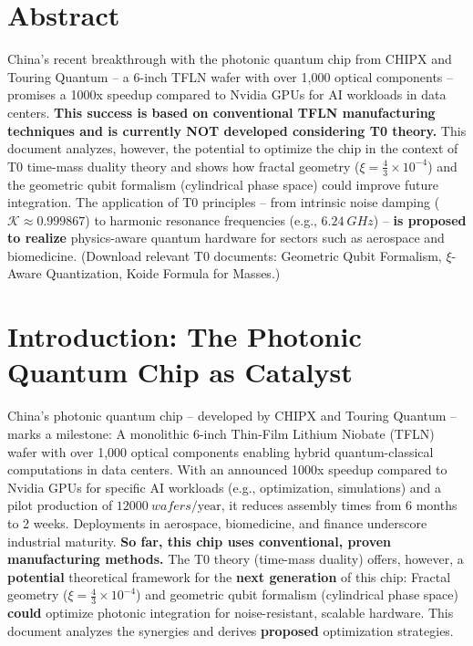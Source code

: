 \hfuzz=200pt
	
\section*{Abstract}
		China's recent breakthrough with the photonic quantum chip from CHIPX and Touring Quantum – a 6-inch TFLN wafer with over 1,000 optical components – promises a 1000x speedup compared to Nvidia GPUs for AI workloads in data centers. \textbf{This success is based on conventional TFLN manufacturing techniques and is currently NOT developed considering T0 theory.} This document analyzes, however, the potential to optimize the chip in the context of T0 time-mass duality theory and shows how fractal geometry ($\xi = \frac{4}{3} \times 10^{-4}$) and the geometric qubit formalism (cylindrical phase space) could improve future integration. The application of T0 principles – from intrinsic noise damping ($\mathcal{K} \approx 0.999867$) to harmonic resonance frequencies (e.g., $\SI{6.24}{GHz}$) – \textbf{is proposed to realize} physics-aware quantum hardware for sectors such as aerospace and biomedicine.
		(Download relevant T0 documents: Geometric Qubit Formalism, $\xi$-Aware Quantization, Koide Formula for Masses.)

	
	\section{Introduction: The Photonic Quantum Chip as Catalyst}
	
	China's photonic quantum chip – developed by CHIPX and Touring Quantum – marks a milestone: A monolithic 6-inch Thin-Film Lithium Niobate (TFLN) wafer with over 1,000 optical components enabling hybrid quantum-classical computations in data centers. With an announced 1000x speedup compared to Nvidia GPUs for specific AI workloads (e.g., optimization, simulations) and a pilot production of $\SI{12000}{wafers}/\text{year}$, it reduces assembly times from 6 months to 2 weeks. Deployments in aerospace, biomedicine, and finance underscore industrial maturity. \textbf{So far, this chip uses conventional, proven manufacturing methods.} The T0 theory (time-mass duality) offers, however, a \textbf{potential} theoretical framework for the \textbf{next generation} of this chip: Fractal geometry ($\xi = \frac{4}{3} \times 10^{-4}$) and geometric qubit formalism (cylindrical phase space) \textbf{could} optimize photonic integration for noise-resistant, scalable hardware. This document analyzes the synergies and derives \textbf{proposed} optimization strategies.
	
